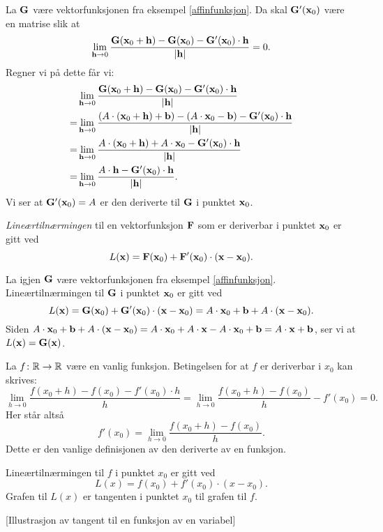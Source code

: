 \begin{eksempel}
  La $\mathbf{G}$ være vektorfunksjonen fra eksempel \ref{affinfunksjon}.
  Da skal $\mathbf{G}'(\mathbf{x}_0)$ være en matrise slik at 
  $$\lim_{\mathbf{h}\to 0} \frac{\mathbf{G}(\mathbf{x}_0+\mathbf{h}) - \mathbf{G}(\mathbf{x}_0) -
  \mathbf{G}'(\mathbf{x}_0) \cdot \mathbf{h}}{|\mathbf{h}|} = 0.$$
  Regner vi på dette får vi:
  \begin{align*}
    &
    \lim_{\mathbf{h}\to 0} \frac{\mathbf{G}(\mathbf{x}_0+\mathbf{h}) -
    \mathbf{G}(\mathbf{x}_0) -
    \mathbf{G}'(\mathbf{x}_0) \cdot \mathbf{h}}{|\mathbf{h}|} \\
    =
    &
    \lim_{\mathbf{h}\to 0} \frac{\left(A \cdot (\mathbf{x}_0+\mathbf{h})  +
    \mathbf{b}\right) - \left(A \cdot \mathbf{x}_0  - \mathbf{b}\right) -
    \mathbf{G}'(\mathbf{x}_0) \cdot \mathbf{h}}{|\mathbf{h}|}\\
    =
    &
    \lim_{\mathbf{h}\to 0} \frac{A \cdot (\mathbf{x}_0+\mathbf{h})  +
    A \cdot \mathbf{x}_0  - 
    \mathbf{G}'(\mathbf{x}_0) \cdot \mathbf{h}}{|\mathbf{h}|} \\
    =
    &
    \lim_{\mathbf{h}\to 0} \frac{A \cdot \mathbf{h}  - 
    \mathbf{G}'(\mathbf{x}_0) \cdot \mathbf{h}}{|\mathbf{h}|}.
  \end{align*}
  Vi ser at $\mathbf{G}'(\mathbf{x}_0) = A$ er den deriverte til $\mathbf{G}$ i punktet $\mathbf{x}_0$.
\end{eksempel}

\begin{definisjon}
  {\em Lineærtilnærmingen} til en vektorfunksjon $\mathbf{F}$ som er deriverbar i punktet $\mathbf{x}_0$ er
  gitt ved
  $$L(\mathbf{x}) = \mathbf{F}(\mathbf{x}_0) + \mathbf{F}'(\mathbf{x}_0) \cdot (\mathbf{x} - \mathbf{x}_0).$$
\end{definisjon}

\begin{eksempel}
  La igjen $\mathbf{G}$ være vektorfunksjonen fra eksempel \ref{affinfunksjon}. Lineærtilnærmingen til $\mathbf{G}$ i punktet $\mathbf{x}_0$ er gitt ved
  $$L(\mathbf{x}) = \mathbf{G}(\mathbf{x}_0) + \mathbf{G}'(\mathbf{x}_0) \cdot (\mathbf{x} - \mathbf{x}_0) = A \cdot \mathbf{x}_0 + \mathbf{b} + A \cdot (\mathbf{x} - \mathbf{x}_0).$$
  Siden $A \cdot \mathbf{x}_0 + \mathbf{b} + A \cdot (\mathbf{x} - \mathbf{x}_0) = A \cdot \mathbf{x}_0 + A
  \cdot \mathbf{x} - A \cdot \mathbf{x}_0 + \mathbf{b} = A \cdot \mathbf{x} + \mathbf{b}$, ser vi at
  $L(\mathbf{x}) = \mathbf{G}(\mathbf{x})$.
\end{eksempel}

\begin{eksempel}
  La $f \colon \mathbb{R} \to \mathbb{R}$ være en vanlig funksjon. Betingelsen
  for at $f$ er deriverbar i $x_0$ kan skrives:
  $$\lim_{h\to 0} \frac{f(x_0+h) - f(x_0) - f'(x_0) \cdot h}{h} =
  \lim_{h\to 0} \frac{f(x_0+h) - f(x_0)}{h} - f'(x_0) = 0.$$
  Her står altså 
  $$f'(x_0) = \lim_{h\to 0} \frac{f(x_0+h) - f(x_0)}{h}.$$
  Dette er den vanlige definisjonen av den deriverte av en funksjon.

  Lineærtilnærmingen til $f$ i punktet $x_0$ er gitt ved
  $$L(x) = f(x_0) + f'(x_0) \cdot (x - x_0).$$
  Grafen til $L(x)$ er tangenten i punktet $x_0$ til grafen til $f$.
\end{eksempel}
[Illustrasjon av tangent til en funksjon av en variabel]

